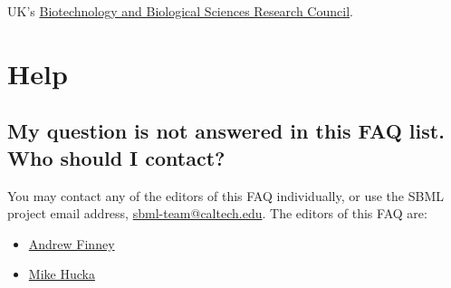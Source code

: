 \documentclass{sbmlfaq}
\begin{document}
UK's \href{http://www.bbsrc.ac.uk/}{Biotechnology and Biological Sciences
  Research Council}.

\section{Help}

\subsection{My question is not answered in this FAQ list. Who should I contact?}
\label{sec:not-answered}

You may contact any of the editors of this FAQ individually, or use the
SBML project email address,
\href{mailto:sbml-team@caltech.edu}{sbml-team@caltech.edu}.  The editors
of this FAQ are:

\begin{itemize}
\item \href{mailto:afinney@cds.caltech.edu}{Andrew Finney}
\item \href{mailto:mhucka@cds.caltech.edu}{Mike Hucka}
\end{itemize}
\end{document}
